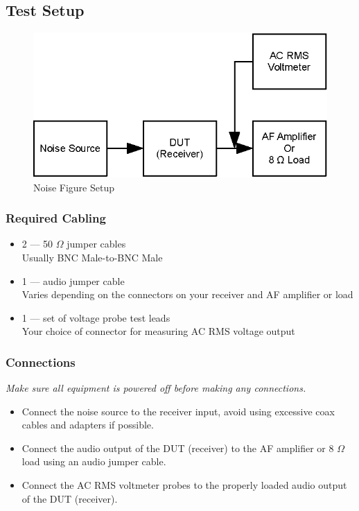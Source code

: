 \documentclass[10pt,letterpaper]{book}
\begin{document}
\subsection*{Test Setup}
\begin{figure}[h]
\centering
\includegraphics[scale=1]{Illustrations/NFSetup}
\caption{Noise Figure Setup}
\end{figure}
\subsubsection*{Required Cabling}
\begin{itemize}
		\item 2 --- 50 $\Omega$ jumper cables \\
		Usually BNC Male-to-BNC Male
	\item 1 --- audio jumper cable \\
		Varies depending on the connectors on your receiver and AF amplifier or load
	\item 1 --- set of voltage probe test leads \\
		Your choice of connector for measuring AC RMS voltage output
\end{itemize}
\subsubsection*{Connections}
\emph{Make sure all equipment is powered off before making any connections.}
\begin{itemize}
\item Connect the noise source to the receiver input, avoid using excessive coax cables and adapters if possible.
	\item Connect the audio output of the DUT (receiver) to the AF amplifier or 8 $\Omega$ load using an audio jumper cable.
	\item Connect the AC RMS voltmeter probes to the properly loaded audio output of the DUT (receiver).
\end{itemize}
\end{document}
